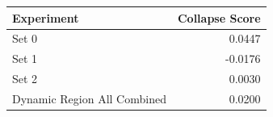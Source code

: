 \begin{tabular}{lr}
\toprule
Experiment & Collapse Score \\
\midrule
Set 0 & 0.0447 \\
Set 1 & -0.0176 \\
Set 2 & 0.0030 \\
Dynamic Region All Combined & 0.0200 \\
\bottomrule
\end{tabular}
